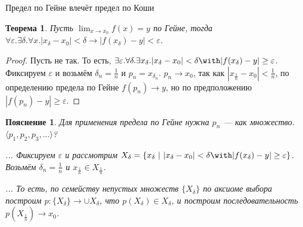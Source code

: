 \documentclass[aspectratio=169]{beamer}
\newtheorem{thm}{Теорема}[section]
\newtheorem{snote}{Пояснение}[section]
\begin{document}
\begin{frame}{Предел по Гейне влечёт предел по Коши}
\begin{thm}
Пусть $\lim_{x \rightarrow x_0}f(x) = y$ по Гейне, тогда
$\forall \varepsilon.\exists \delta.\forall x.|x_\delta-x_0|<\delta \rightarrow |f(x_\delta)-y| < \varepsilon$.
\end{thm}

\begin{proof}
Пусть не так. То есть, 
$\exists \varepsilon.\forall \delta.\exists x_\delta.|x_\delta-x_0|<\delta \with |f(x_\delta)-y| \ge \varepsilon$.
Фиксируем $\varepsilon$ и возьмём $\delta_n = \frac{1}{n}$ и $p_n = x_{\delta_n}$. 
$p_n \rightarrow x_0$, так как $|x_\frac{1}{n} - x_0| < \frac{1}{n}$, 
{\color{blue}по определению предела по Гейне} $f(p_n) \rightarrow y$, 
но по предположению $|f(p_n) - y| \ge \varepsilon$.
\end{proof}\pause

\begin{snote}
Для применения предела по Гейне нужна $p_n$ --- как множество. $\langle p_1, p_2, p_3, \dots\rangle$?\pause

... %
Фиксируем $\varepsilon$ и рассмотрим $X_\delta = \{ x_\delta \ |\ |x_\delta-x_0| <\delta \with |f(x_\delta)-y| \ge \varepsilon\}$.
Возьмём $\delta_n = \frac{1}{n}$ и $x_{\frac{1}{n}} \in X_\frac{1}{n}$.\pause

... То есть, по семейству непустых множеств $\{ X_\delta \}$ по аксиоме выбора построим $p: \{ X_\delta \} \rightarrow \cup X_\delta$,
что $p(X_\delta) \in X_\delta$, и построим последовательность $p(X_\frac{1}{n}) \rightarrow x_0$.
\end{snote}
\end{frame}
\end{document}
